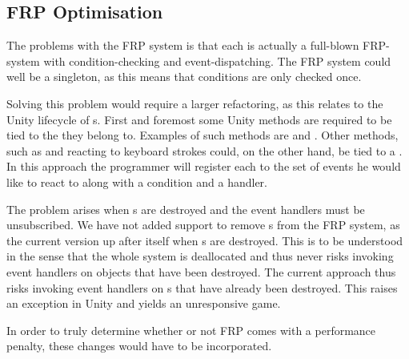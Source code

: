 \subsection{FRP Optimisation} \label{sec:fw:frp:optimisation}
The problems with the \gls{FRP} system is that each  is actually a full-blown \gls{FRP}-system with condition-checking and event-dispatching. The \gls{FRP} system could well be a singleton, as this means that conditions are only checked once.

Solving this problem would require a larger refactoring, as this relates to the Unity lifecycle of s. First and foremost some Unity methods are required to be tied to the  they belong to. Examples of such methods are  and . Other methods, such as  and reacting to keyboard strokes could, on the other hand, be tied to a . In this approach the programmer will register each  to the set of events he would like to react to along with a condition and a handler.

The problem arises when s are destroyed and the event handlers must be unsubscribed. We have not added support to remove s from the \gls{FRP} system, as the current version  up after itself when s are destroyed. This is to be understood in the sense that the whole system is deallocated and thus never risks invoking event handlers on objects that have been destroyed. The current approach thus risks invoking event handlers on s that have already been destroyed. This raises an exception in Unity and yields an unresponsive game.

In order to truly determine whether or not \gls{FRP} comes with a performance penalty, these changes would have to be incorporated.
